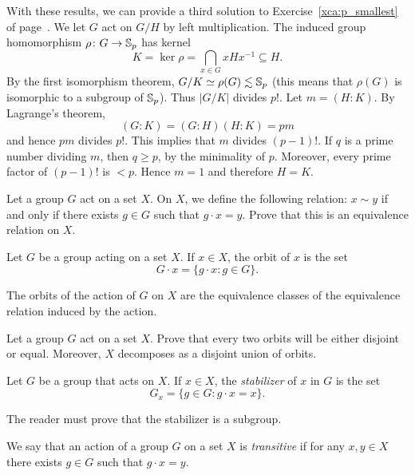 \begin{optional}
With these results, we can provide a third 
solution to Exercise~\ref{xca:p_smallest} of 
page~\pageref{xca:p_smallest}.
We let  $G$ act on $G/H$ by left multiplication. 
The induced group homomorphism  $\rho\colon G\to\mathbb{S}_p$ has 
kernel 
\[
K=\ker\rho=\bigcap_{x\in G}xHx^{-1}\subseteq H.
\]
By the first isomorphism theorem, 
$G/K\simeq\rho(G)\lesssim\mathbb{S}_p$ (this means that 
$\rho(G)$ is isomorphic to a subgroup of $\mathbb{S}_p$). 
Thus $|G/K|$ divides $p!$.
Let $m=(H:K)$. By Lagrange's theorem,
\[
(G:K)=(G:H)(H:K)=pm
\]
and hence $pm$ divides $p!$. This implies that $m$ divides $(p-1)!$. If $q$ is a prime number dividing 
 $m$, then $q\geq p$, by the minimality of $p$. Moreover, 
 every prime factor of $(p-1)!$ is 
 $<p$. Hence $m=1$ and therefore $H=K$.
\end{optional}
 
\begin{exercise}
    Let a group $G$ act on a set $X$. 
    On $X$, we define the following relation: $x\sim y$ if and only if
    there exists $g\in G$ such that $g\cdot x=y$. Prove 
    that this is an equivalence relation on $X$. 
\end{exercise}

\begin{definition}
Let $G$ be a group acting on a set $X$. If $x\in X$, the
orbit of $x$ is the set
\[
G\cdot x=\{g\cdot x:g\in G\}.
\]
\end{definition}

The orbits of the action of $G$ on $X$ are 
the equivalence classes of the equivalence 
relation induced by the action. 

\begin{exercise}
    Let a group $G$ act on a set $X$. Prove that 
    every two orbits will be either disjoint or equal. Moreover, 
    $X$ decomposes as a disjoint union of orbits. 
\end{exercise}

\begin{definition}
        Let $G$ be a group that acts on $X$. If $x\in X$, the \emph{stabilizer} of $x$ in $G$
        is the set   
        \[
        G_x=\{g\in G:g\cdot x=x\}.
        \]
\end{definition}

The reader must prove that the stabilizer is a subgroup. 

\begin{definition}
We say that an action of a group $G$ on a set $X$
is \emph{transitive} if for any $x,y\in X$ there exists $g\in G$ such that $g\cdot x=y$.
\end{definition}

